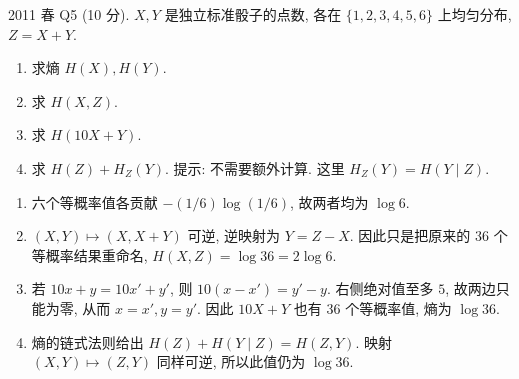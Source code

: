 \begin{exercise}\label{ex:fe2011q5}
2011 春 Q5 (10 分). $X,Y$ 是独立标准骰子的点数, 各在 $\{1,2,3,4,5,6\}$ 上均匀分布, $Z=X+Y$.
\begin{enumerate}[label=(\alph*)]
\item\label{ex:fe2011q5-a} 求熵 $H(X),H(Y)$.
\item\label{ex:fe2011q5-b} 求 $H(X,Z)$.
\item\label{ex:fe2011q5-c} 求 $H(10X+Y)$.
\item\label{ex:fe2011q5-d} 求 $H(Z)+H_Z(Y)$. 提示: 不需要额外计算. 这里 $H_Z(Y)=H(Y\mid Z)$.
\end{enumerate}
\end{exercise}
\begin{solution}
\begin{enumerate}[label=(\alph*)]
\item\label{sol:fe2011q5-a} 六个等概率值各贡献 $-(1/6)\log(1/6)$, 故两者均为 $\log6$.
\item\label{sol:fe2011q5-b} $(X,Y)\mapsto(X,X+Y)$ 可逆, 逆映射为 $Y=Z-X$. 因此只是把原来的 $36$ 个等概率结果重命名, $H(X,Z)=\log36=2\log6$.
\item\label{sol:fe2011q5-c} 若 $10x+y=10x'+y'$, 则 $10(x-x')=y'-y$. 右侧绝对值至多 $5$, 故两边只能为零, 从而 $x=x',y=y'$. 因此 $10X+Y$ 也有 $36$ 个等概率值, 熵为 $\log36$.
\item\label{sol:fe2011q5-d} 熵的链式法则给出 $H(Z)+H(Y\mid Z)=H(Z,Y)$. 映射 $(X,Y)\mapsto(Z,Y)$ 同样可逆, 所以此值仍为 $\log36$.
\end{enumerate}
\end{solution}

